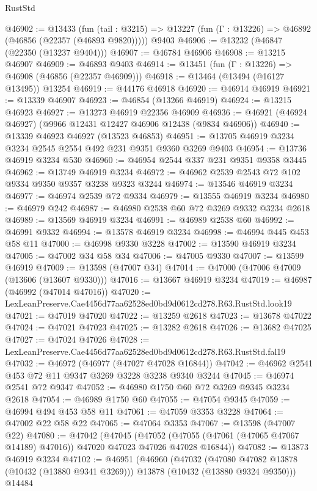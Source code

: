 \begin{lexlean}{RustStd}
\begin{coremodule}
@46902 := @13433
    (fun (tail : @3215) => @13227 (fun (Γ : @13226) => @46892 (@46856 (@22357 (@46893 @9820)))))
    @9403
@46906 := @13232 (@46847 (@22350 (@13237 @9404)))
@46907 := @46784 @46906
@46908 := @13215 @46907
@46909 := @46893 @9403
@46914 := @13451 (fun (Γ : @13226) => @46908 (@46856 (@22357 @46909)))
@46918 := @13464 (@13494 (@16127 @13495)) @13254
@46919 := @44176 @46918
@46920 := @46914 @46919
@46921 := @13339 @46907
@46923 := @46854 (@13266 @46919)
@46924 := @13215 @46923
@46927 := @13273 @46919 @22356 @46909
@46936 := @46921 (@46924 @46927) (@9966 @12431 @12427 @46906 @12438 (@9834 @46906))
@46940 := @13339 @46923 @46927 (@13523 @46853)
@46951 := @13705 @46919 @3234 @3234 @2545 @2554 @492 @231 @9351 @9360 @3269 @9403
@46954 := @13736 @46919 @3234 @530
@46960 := @46954 @2544 @337 @231 @9351 @9358 @3445
@46962 := @13749 @46919 @3234
@46972 := @46962 @2539 @2543 @72 @102 @9334 @9350 @9357 @3238 @9323 @3244
@46974 := @13546 @46919 @3234
@46977 := @46974 @2539 @72 @9334
@46979 := @13555 @46919 @3234
@46980 := @46979 @242
@46987 := @46980 @2538 @60 @72 @3269 @9332 @3234 @2618
@46989 := @13569 @46919 @3234
@46991 := @46989 @2538 @60
@46992 := @46991 @9332
@46994 := @13578 @46919 @3234
@46998 := @46994 @445 @453 @58 @11
@47000 := @46998 @9330 @3228
@47002 := @13590 @46919 @3234
@47005 := @47002 @34 @58 @34
@47006 := @47005 @9330
@47007 := @13599 @46919
@47009 := @13598 (@47007 @34)
@47014 := @47000 (@47006 @47009 (@13606 (@13607 @9330)))
@47016 := @13667 @46919 @3234
@47019 := @46987 (@46992 (@47014 @47016))
@47020 := LexLeanPreserve.Cae4456d77aa62528ed0bd9d0612cd278.R63.RustStd.look19
@47021 := @47019 @47020
@47022 := @13259 @2618
@47023 := @13678 @47022
@47024 := @47021 @47023
@47025 := @13282 @2618
@47026 := @13682 @47025
@47027 := @47024 @47026
@47028 := LexLeanPreserve.Cae4456d77aa62528ed0bd9d0612cd278.R63.RustStd.fal19
@47032 := @46972 (@46977 (@47027 @47028 @16844))
@47042 := @46962 @2541 @453 @72 @11 @9347 @3269 @3228 @3238 @9340 @3244
@47045 := @46974 @2541 @72 @9347
@47052 := @46980 @1750 @60 @72 @3269 @9345 @3234 @2618
@47054 := @46989 @1750 @60
@47055 := @47054 @9345
@47059 := @46994 @494 @453 @58 @11
@47061 := @47059 @3353 @3228
@47064 := @47002 @22 @58 @22
@47065 := @47064 @3353
@47067 := @13598 (@47007 @22)
@47080 := @47042
    (@47045
      (@47052 (@47055 (@47061 (@47065 @47067 @14189) @47016)) @47020 @47023 @47026 @47028 @16844))
@47082 := @13873 @46919 @3234
@47102 := @46951
    (@46960
      (@47032
        (@47080 @47082 @13878 (@10432 (@13880 @9341 @3269)))
        @13878
        (@10432 (@13880 @9324 @9350)))
      @14484

\end{coremodule}
\end{lexlean}
